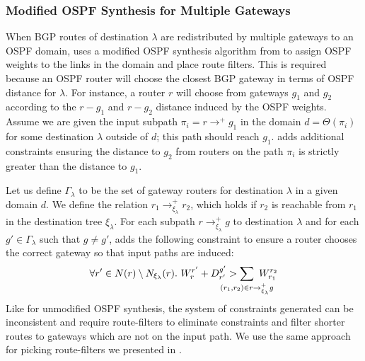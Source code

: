 \subsubsection{Modified OSPF Synthesis for Multiple Gateways}
When BGP routes of destination $\lambda$ 
are redistributed by multiple gateways to an 
OSPF domain, \name uses a modified OSPF synthesis
algorithm from  to assign OSPF weights to the links in the domain
and place route filters. 
This is 
required because an OSPF router will choose
the closest BGP gateway in terms of OSPF distance 
for $\lambda$. For instance, a router $r$ will choose
from gateways $g_1$ and $g_2$ according to the $r-g_1$
and $r-g_2$ distance induced by the OSPF weights. 
Assume we are given the input subpath $\pi_i=r \rightarrow^+ g_1$ in
the domain $d=\Theta(\pi_i)$ for some destination $\lambda$ outside
of $d$; this path should reach $g_1$. 
\name adds additional
constraints ensuring the distance to $g_2$ from routers
on the path $\pi_i$ is strictly
greater than the distance to $g_1$. 

Let us define $\Gamma_\lambda$ to be the set of gateway
routers for destination $\lambda$ in a given domain $d$. 
We define the relation $r_1 \rightarrow^+_{\xi_{\lambda}} r_2$, which holds if
$r_2$ is reachable from $r_1$ in the destination tree $\xi_\lambda$.
For each subpath $r \rightarrow^+_{\xi_{\lambda}} g$ to destination $\lambda$
and for each $g' \in \Gamma_{\lambda}$ such that $g\neq g'$,
\name adds the following constraint
to ensure a router
chooses the correct gateway so that input 
paths are induced: 
\begin{multline} \label{eq:gateway}
\forall r' \in N(r) \setminus N_{\xi_\lambda}(r).~
W_r^{r'} + D_{r'}^{g'} > \sum_{\mathclap{\substack{(r_1,r_2) \in r \rightarrow^+_{\xi_{\lambda}} g }}} 
~W_{r_1}^{r_2}
\end{multline}
Like for unmodified OSPF synthesis, the system of
constraints generated can be inconsistent and require
route-filters to eliminate constraints
and  filter shorter routes to gateways which are
not on the input path.
We use the same 
approach for picking route-filters we presented in
. 